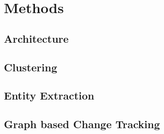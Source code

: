 \section{Methods}

\subsection{Architecture}

\subsection{Clustering}

\subsection{Entity Extraction}

\subsection{Graph based Change Tracking}

